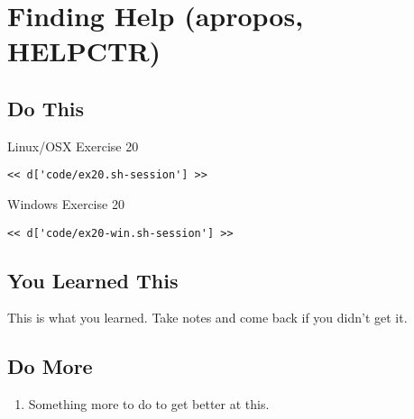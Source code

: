 \chapter{Finding Help (apropos, HELPCTR)}

\section{Do This}

\begin{code}{Linux/OSX Exercise 20}
\begin{Verbatim}
<< d['code/ex20.sh-session'] >>
\end{Verbatim}
\end{code}

\begin{code}{Windows Exercise 20}
\begin{Verbatim}
<< d['code/ex20-win.sh-session'] >>
\end{Verbatim}
\end{code}

\section{You Learned This}

This is what you learned.  Take notes and come back if you didn't get it.

\section{Do More}

\begin{enumerate}
\item Something more to do to get better at this.
\end{enumerate}


